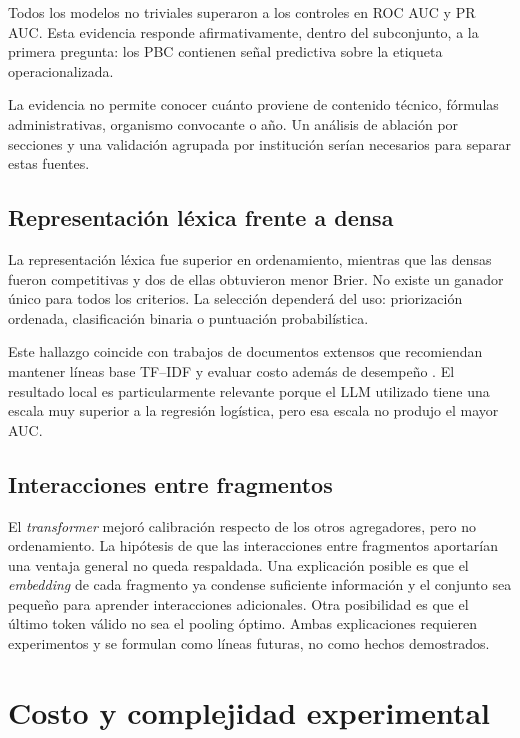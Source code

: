 Todos los modelos no triviales superaron a los controles en ROC AUC y PR AUC. Esta evidencia responde afirmativamente, dentro del subconjunto, a la primera pregunta: los PBC contienen señal predictiva sobre la etiqueta operacionalizada.

La evidencia no permite conocer cuánto proviene de contenido técnico, fórmulas administrativas, organismo convocante o año. Un análisis de ablación por secciones y una validación agrupada por institución serían necesarios para separar estas fuentes.

\subsection{Representación léxica frente a densa}

La representación léxica fue superior en ordenamiento, mientras que las densas fueron competitivas y dos de ellas obtuvieron menor Brier. No existe un ganador único para todos los criterios. La selección dependerá del uso: priorización ordenada, clasificación binaria o puntuación probabilística.

Este hallazgo coincide con trabajos de documentos extensos que recomiendan mantener líneas base TF--IDF y evaluar costo además de desempeño \parencite{mamakas2022legal,tuteja2023longtext}. El resultado local es particularmente relevante porque el LLM utilizado tiene una escala muy superior a la regresión logística, pero esa escala no produjo el mayor AUC.

\subsection{Interacciones entre fragmentos}

El \textit{transformer} mejoró calibración respecto de los otros agregadores, pero no ordenamiento. La hipótesis de que las interacciones entre fragmentos aportarían una ventaja general no queda respaldada. Una explicación posible es que el \textit{embedding} de cada fragmento ya condense suficiente información y el conjunto sea pequeño para aprender interacciones adicionales. Otra posibilidad es que el último token válido no sea el pooling óptimo. Ambas explicaciones requieren experimentos y se formulan como líneas futuras, no como hechos demostrados.

\section{Costo y complejidad experimental}

